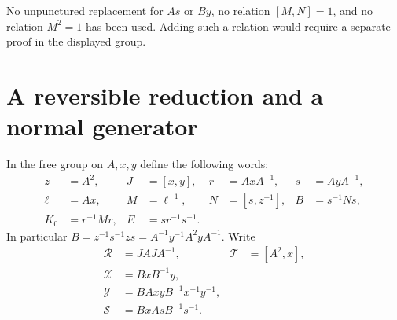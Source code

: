 \documentclass[11pt]{amsart}
\theoremstyle{definition}
\theoremstyle{remark}
\begin{document}
No unpunctured replacement for $As$ or $By$, no relation $[M,N]=1$,
and no relation $M^2=1$ has been used. Adding such a relation would
require a separate proof in the displayed group.

\section{A reversible reduction and a normal generator}\label{sec:reduction}

In the free group on $A,x,y$ define the following words:
\begin{equation}\label{eq:dictionary}
\begin{aligned}
 z&=A^2,&J&=[x,y],&r&=AxA^{-1},&s&=AyA^{-1},\\
 \ell&=Ax,&M&=\ell^{-1},&N&=[s,z^{-1}],&B&=s^{-1}Ns,\\
 K_0&=r^{-1}Mr,&E&=sr^{-1}s^{-1}.&&&&
\end{aligned}
\end{equation}
In particular
$B=z^{-1}s^{-1}zs=A^{-1}y^{-1}A^2yA^{-1}$.
Write
\begin{equation}\label{eq:five}
\begin{aligned}
 \mathcal R&=JAJA^{-1},&\mathcal T&=[A^2,x],\\
 \mathcal X&=BxB^{-1}y,\\
 \mathcal Y&=BAxyB^{-1}x^{-1}y^{-1},\\
 \mathcal S&=BxAsB^{-1}s^{-1}.
\end{aligned}
\end{equation}
\end{document}
